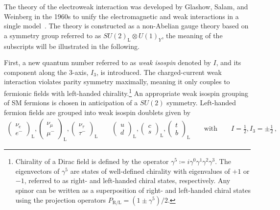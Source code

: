 The theory of the electroweak interaction was developed by Glashow, Salam, and
Weinberg in the 1960s to unify the electromagnetic and weak interactions in a
single model~\cite{Glashow:1961tr,Salam:1964ry,Weinberg:1967tq}. The theory is
constructed as a non-Abelian gauge theory based on a symmetry group referred to
as $SU(2)_{\text{L}} \otimes U(1)_{Y}$, the meaning of the subscripts will be
illustrated in the following.

First, a new quantum number referred to as \emph{weak isospin} denoted by $I$,
and its component along the 3-axis, $I_3$, is introduced. The charged-current
weak interaction violates parity symmetry maximally, meaning it only couples to
fermionic fields with left-handed chirality.\footnote{Chirality of a Dirac field
  is defined by the operator
  $\gamma^5 \coloneq i \gamma^0 \gamma^1 \gamma^2 \gamma^3$. The eigenvectors of
  $\gamma^5$ are states of well-defined chirality with eigenvalues of $+1$ or
  $-1$, referred to as right- and left-handed chiral states, respectively. Any
  spinor can be written as a superposition of right- and left-handed chiral
  states using the projection operators
  $P_{\text{R/L}} = (1 \pm \gamma^5) / 2$.} An appropriate weak isospin grouping
of SM fermions is chosen in anticipation of a $SU(2)$ symmetry.
Left-handed fermion fields are grouped into weak isospin doublets given by
\begin{align*}
  \begin{pmatrix}
    \nu_{e} \\
    e^{-}
  \end{pmatrix}_{\text{L}},
  \begin{pmatrix}
    \nu_{\mu} \\
    \mu^{-}
  \end{pmatrix}_{\text{L}},
  \begin{pmatrix}
    \nu_{\tau} \\
    \tau^{-}
  \end{pmatrix}_{\text{L}}
  \qquad
  \begin{pmatrix}
    u \\
    d
  \end{pmatrix}_{\text{L}},
  \begin{pmatrix}
    c \\
    s
  \end{pmatrix}_{\text{L}},
  \begin{pmatrix}
    t \\
    b
  \end{pmatrix}_{\text{L}}
  \qquad
  \text{with}
  \qquad
  I = \frac{1}{2}, I_3 = \pm \frac{1}{2} \,\text{,}
\end{align*}

